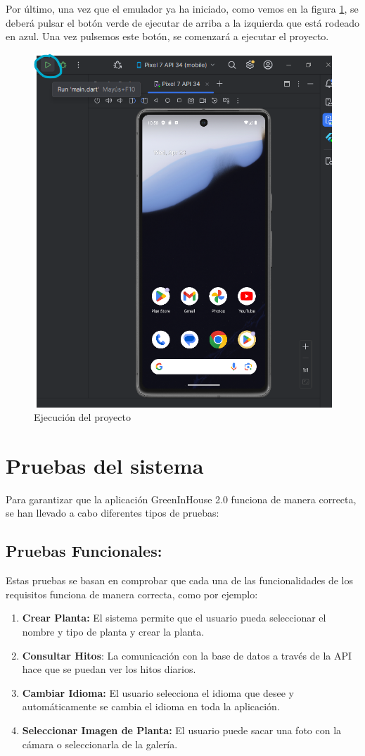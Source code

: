 Por último, una vez que el emulador ya ha iniciado, como vemos en la figura \ref{C17}, se deberá pulsar el botón verde de ejecutar de arriba a la izquierda que está rodeado en azul. Una vez pulsemos este botón, se comenzará a ejecutar el proyecto.

\begin{figure}[H]
    \centering
    \includegraphics[width=0.8\linewidth]{InstalacionyEjecucion6.png}
    \caption{Ejecución del proyecto}
    \label{C17}
\end{figure}


\section{Pruebas del sistema}
Para garantizar que la aplicación GreenInHouse 2.0 funciona de manera correcta, se han llevado a cabo diferentes tipos de pruebas: 

\subsection{Pruebas Funcionales:} Estas pruebas se basan en comprobar que cada una de las funcionalidades de los requisitos funciona de manera correcta, como por ejemplo:
    \begin{enumerate}
        \item \textbf{Crear Planta:} El sistema permite que el usuario pueda seleccionar el nombre y tipo de planta y crear la planta.
        \item \textbf{Consultar Hitos}: La comunicación con la base de datos a través de la API hace que se puedan ver los hitos diarios.
        \item \textbf{Cambiar Idioma:} El usuario selecciona el idioma que desee y automáticamente se cambia el idioma en toda la aplicación.
        \item \textbf{Seleccionar Imagen de Planta:} El usuario puede sacar una foto con la cámara o seleccionarla de la galería.
    \end{enumerate}
